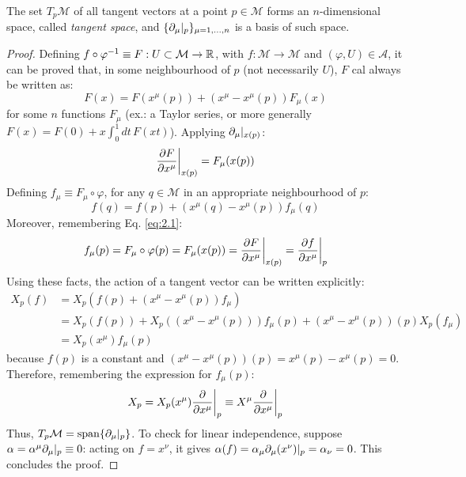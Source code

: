 \begin{theorem}
  The set $ T_p\mathcal{M} $ of all tangent vectors at a point $ p\in\mathcal{M} $ forms an $ n $-dimensional space, called \textit{tangent space}, and $ \{\partial_{\mu}\vert_p\}_{\mu = 1,\dots,n} $ is a basis of such space.
\end{theorem}
\begin{proof}
  Defining $ f \circ \varphi^{-1} \equiv F : U \subset \mathcal{M} \rightarrow \mathbb{R} $, with $ f : \mathcal{M} \rightarrow \mathcal{M} $ and $ (\varphi,U) \in \mathcal{A} $, it can be proved that, in some neighbourhood of $ p $ (not necessarily $ U $), $ F $ cal always be written as:
  \begin{equation*}
    F(x) = F(x^{\mu}(p)) + \left( x^{\mu} - x^{\mu}(p) \right) F_{\mu}(x)
  \end{equation*}
  for some $ n $ functions $ F_{\mu} $ (ex.: a Taylor series, or more generally $ F(x) = F(0) + x \int_0^1 dt\,F(xt) $). Applying $ \partial_{\mu}\vert_{x(p)} $:
  \begin{equation*}
    \frac{\partial F}{\partial x^{\mu}}\bigg\vert_{x(p)} = F_{\mu}(x(p))
  \end{equation*}
  Defining $ f_{\mu} \equiv F_{\mu} \circ \varphi $, for any $ q \in \mathcal{M} $ in an appropriate neighbourhood of $ p $:
  \begin{equation*}
    f(q) = f(p) + \left( x^{\mu}(q) - x^{\mu}(p) \right) f_{\mu}(q)
  \end{equation*}
  Moreover, remembering Eq. \ref{eq:2.1}:
  \begin{equation*}
    f_{\mu}(p) = F_{\mu} \circ \varphi(p) = F_{\mu}(x(p)) = \frac{\partial F}{\partial x^{\mu}}\bigg\vert_{x(p)} = \frac{\partial f}{\partial x^{\mu}}\bigg\vert_p
  \end{equation*}
  Using these facts, the action of a tangent vector can be written explicitly:
  \begin{equation*}
    \begin{split}
      X_p(f)
      &= X_p\left( f(p) + \left( x^{\mu} - x^{\mu}(p) \right) f_{\mu} \right)\\
      &= X_p\left( f(p) \right) + X_p\left( \left( x^{\mu} - x^{\mu}(p) \right) \right) f_{\mu}(p) + \left( x^{\mu} - x^{\mu}(p) \right)(p) X_p\left( f_{\mu} \right)\\
      &= X_p\left( x^{\mu} \right) f_{\mu}(p)
    \end{split}
  \end{equation*}
  because $ f(p) $ is a constant and $ \left( x^{\mu} - x^{\mu}(p) \right)(p) = x^{\mu}(p) - x^{\mu}(p) = 0 $. Therefore, remembering the expression for $ f_{\mu}(p) $:
  \begin{equation*}
    X_p = X_p(x^{\mu}) \frac{\partial}{\partial x^{\mu}}\bigg\vert_p \equiv X^{\mu} \frac{\partial}{\partial x^{\mu}}\bigg\vert_p
  \end{equation*}
  Thus, $ T_p\mathcal{M} = \operatorname{span}\{\partial_{\mu}\vert_p\} $. To check for linear independence, suppose $ \alpha = \alpha^{\mu} \partial_{\mu}\vert_p \equiv 0 $: acting on $ f = x^{\nu} $, it gives $ \alpha(f) = \alpha_{\mu} \partial_{\mu}(x^{\nu})\vert_p = \alpha_{\nu} = 0 $. This concludes the proof.
\end{proof}


